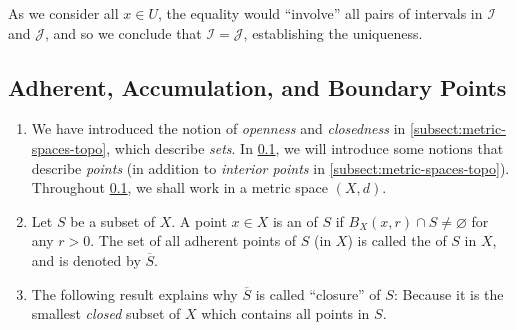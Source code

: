 \begin{enumerate}
\begin{pf}
As we consider all \(x\in U\), the equality would ``involve'' all pairs of
intervals in \(\mathcal{I}\) and \(\mathcal{J}\), and so we conclude that
\(\mathcal{I}=\mathcal{J}\), establishing the uniqueness.
\end{pf}
\end{enumerate}
\subsection{Adherent, Accumulation, and Boundary Points}
\label{subsect:adher-accum-bound-pts}
\begin{enumerate}
\item We have introduced the notion of \emph{openness} and \emph{closedness} in
\cref{subsect:metric-spaces-topo}, which describe \emph{sets}. In
\cref{subsect:adher-accum-bound-pts}, we will introduce some notions that
describe \emph{points} (in addition to \emph{interior points} in
\cref{subsect:metric-spaces-topo}). Throughout
\cref{subsect:adher-accum-bound-pts}, we shall work in a metric space
\((X,d)\).

\item Let \(S\) be a subset of \(X\). A point \(x\in X\) is an  of \(S\) if \(B_X(x,r)\cap S\ne\varnothing\) for any \(r>0\). The set of
all adherent points of \(S\) (in \(X\)) is called the  of \(S\)
in \(X\), and is denoted by \(\overline{S}\).
\begin{center}
\end{center}

\item The following result explains why \(\overline{S}\) is called ``closure''
of \(S\): Because it is the smallest \emph{closed} subset of \(X\) which
contains all points in \(S\).


\end{enumerate}
